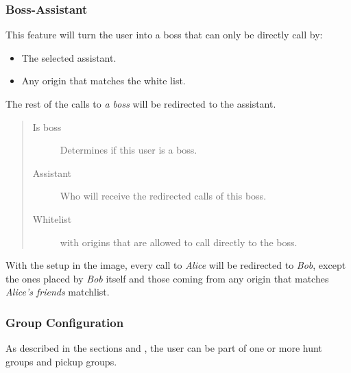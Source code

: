 \documentclass[letterpaper,10pt,spanish]{sphinxmanual}
\begin{document}
\subsubsection{Boss-Assistant}
\label{administration_portal/client/vpbx/users:boss-assistant}
This feature will turn the user into a boss that can only be directly call by:
\begin{itemize}
\item {} 
The selected assistant.

\item {} 
Any origin that matches the white list.

\end{itemize}

The rest of the calls to \emph{a boss} will be redirected to the assistant.
\begin{quote}
\begin{description}
\item[{Is boss}] \leavevmode
Determines if this user is a boss.

\item[{Assistant}] \leavevmode
Who will receive the redirected calls of this boss.

\item[{Whitelist}] \leavevmode
{\hyperref[administration_portal/client/vpbx/routing_tools/match_lists:match\string-lists]{}} with origins that are allowed to call directly to
the boss.

\end{description}
\end{quote}

With the setup in the image, every call to \emph{Alice} will be redirected to \emph{Bob},
except the ones placed by \emph{Bob} itself and those coming from any origin that matches
\emph{Alice's friends} matchlist.


\subsubsection{Group Configuration}
\label{administration_portal/client/vpbx/users:group-configuration}
As described in the sections {\hyperref[administration_portal/client/vpbx/routing_endpoints/hunt_groups:huntgroups]{}} and {\hyperref[administration_portal/client/vpbx/user_configuration/pick_up_groups:capture\string-groups]{}}, the
user can be part of one or more hunt groups and pickup groups.
\end{document}

